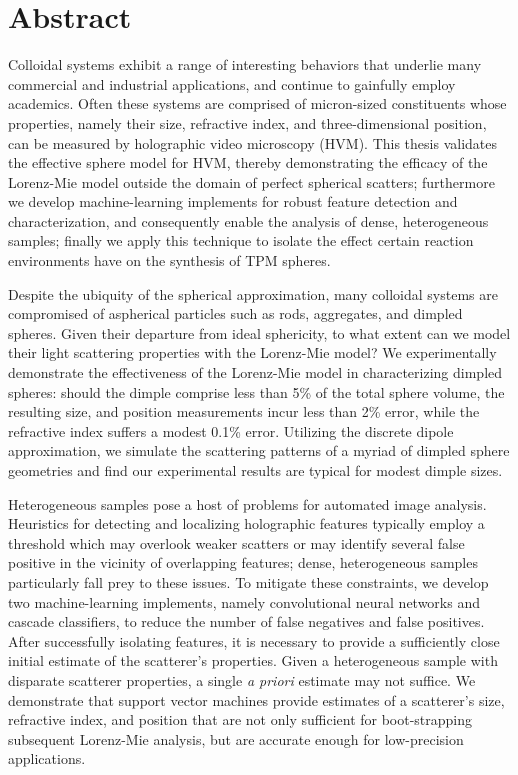 \chapter*{Abstract}
\label{ch:abstract}


Colloidal systems exhibit a range of interesting behaviors that
underlie many commercial and industrial applications, and continue
to gainfully employ academics. Often these systems are comprised of
micron-sized constituents whose properties, namely their
size, refractive index, and three-dimensional position, can be measured
by holographic video microscopy (HVM). This thesis validates the effective
sphere model for HVM, thereby demonstrating the efficacy of the
Lorenz-Mie model outside the domain of perfect spherical scatters;
furthermore we develop machine-learning implements for robust feature
detection and characterization, and consequently enable the analysis of
dense, heterogeneous samples; finally we apply this technique to
isolate the effect certain reaction environments have on the
synthesis of TPM spheres.

Despite the ubiquity of the spherical approximation, many colloidal
systems are compromised of aspherical particles such as rods,
aggregates, and dimpled spheres.
Given their departure from
ideal sphericity, to what extent can we model their light scattering
properties with the Lorenz-Mie model?
We experimentally demonstrate the effectiveness of the Lorenz-Mie model
in characterizing dimpled spheres:
should the dimple comprise less than \num{5}\% of the total sphere volume,
the resulting size, and position measurements incur
less than \num{2}\% error, while the refractive index suffers a modest \num{0.1}\%
error. Utilizing the discrete dipole
approximation, we simulate the scattering patterns of a myriad of
dimpled sphere geometries and find our experimental results are
typical for modest dimple sizes.

Heterogeneous samples pose a host of problems for automated
image analysis. Heuristics for detecting and localizing holographic
features typically employ a threshold which may overlook weaker
scatters or may identify several false positive in the vicinity of
overlapping features; dense, heterogeneous samples
particularly fall prey to these issues. To mitigate these constraints, we
develop two machine-learning implements, namely convolutional
neural networks and cascade classifiers, to reduce the number of
false negatives and false positives. After successfully isolating
features, it is necessary to provide a sufficiently close initial
estimate of the scatterer's properties. Given a heterogeneous sample
with disparate scatterer properties, a single {\it a priori}
estimate may not suffice. We demonstrate that support vector machines
provide estimates of a scatterer's size, refractive index, and
position that are not only sufficient for boot-strapping subsequent
Lorenz-Mie analysis, but are accurate enough for low-precision
applications.

